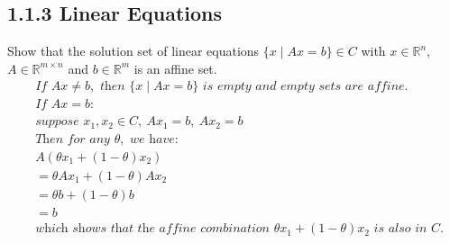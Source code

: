 \documentclass{report}
\begin{document}
	\subsection*{1.1.3 Linear Equations}
	Show that the solution set of linear equations $\{x \mid Ax=b\} \in C$ with $x \in \mathbb{R}^n$, $A \in \mathbb{R}^{m \times n}$ and $b \in \mathbb{R}^m$ is an affine set.
	\begin{align*}
		& \textit{If } Ax \neq b, \textit{ then } \{x \mid Ax = b\} \textit{ is empty and empty sets are affine.} \\
		& \textit{If } Ax = b: \\
		& \textit{suppose } x_1, x_2 \in C, \  Ax_1 = b, \  Ax_2 = b \\
		& \textit{Then for any } \theta, \textit{ we have:} \\
		& A(\theta x_1 + (1-\theta)x_2) \\ 
		& = \theta Ax_1 + (1-\theta) Ax_2 \\
		& = \theta b + (1-\theta)b \\
		& = b \\
		& \textit{which shows that the affine combination } \theta x_1 + (1-\theta)x_2 \textit{ is also in C.}
	\end{align*}
	
\end{document}
